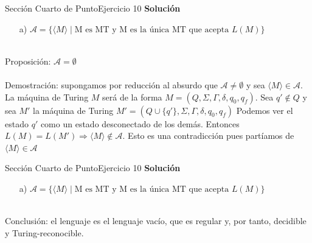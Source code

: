 \documentclass[10pt, envcountsect, presentation, aspectratio=169]{beamer}
\begin{document}
\begin{frame}{Sección Cuarto de Punto}{Ejercicio 10}
    \textbf{Solución}\\
    \begin{itemize}
        \item[a)] $\mathcal{A} = \{\langle M \rangle \mid \mbox{M es MT y  M es la única MT que acepta } L(M)\}$\\~\\
    \end{itemize}

    Proposición: $\mathcal{A} = \emptyset$\\~\\

    Demostración: supongamos por reducción al absurdo que $\mathcal{A} \neq \emptyset$ y sea $\langle M \rangle \in \mathcal{A}.$
    La máquina de Turing $M$ será de la forma $M=(Q,\Sigma,\Gamma,\delta,q_0,q_f)$. Sea $q' \notin Q$ y sea $M'$ la máquina de Turing $M'=(Q \cup \{q'\},\Sigma,\Gamma,\delta,q_0,q_f)$
    Podemos ver el estado $q'$ como un estado desconectado de los demás. Entonces $L(M) = L(M') \Rightarrow \langle M \rangle \notin \mathcal{A}$.
    Esto es una contradicción pues partíamos de $\langle M \rangle \in \mathcal{A}$   
\end{frame}


\begin{frame}{Sección Cuarto de Punto}{Ejercicio 10}
    \textbf{Solución}\\
    \begin{itemize}
        \item[a)] $\mathcal{A} = \{\langle M \rangle \mid \mbox{M es MT y  M es la única MT que acepta } L(M)\}$\\~\\
    \end{itemize}

    Conclusión: el lenguaje es el lenguaje vacío, que es regular y, por tanto, decidible y Turing-reconocible.
\end{frame}

\end{document}
